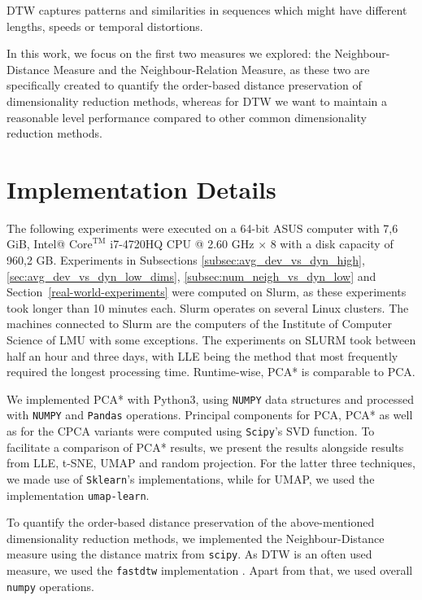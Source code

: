 \documentclass[pdftex,12pt,a4paper]{report}
\begin{document}
DTW captures patterns and similarities in sequences which might have different lengths, speeds or temporal distortions.

In this work, we focus on the first two measures we explored: the Neighbour-Distance Measure and the Neighbour-Relation Measure, as these two are specifically created to quantify the order-based distance preservation of dimensionality reduction methods, whereas for DTW we want to maintain a reasonable level performance compared to other common dimensionality reduction methods.

\section{Implementation Details}
The following experiments were executed on a 64-bit ASUS computer with 7,6 GiB, Intel@ $\mathrm{Core}^{\mathrm{TM}}$ i7-4720HQ CPU @ 2.60 GHz $\times$ 8 with a disk capacity of 960,2 GB.
Experiments in Subsections \ref{subsec:avg_dev_vs_dyn_high}, \ref{sec:avg_dev_vs_dyn_low_dims}, \ref{subsec:num_neigh_vs_dyn_low} and Section~\ref{real-world-experiments} were computed on Slurm, as these experiments took longer than 10 minutes each.
Slurm operates on several Linux clusters.
The machines connected to Slurm are the computers of the Institute of Computer Science of LMU with some exceptions.
The experiments on SLURM took between half an hour and three days, with LLE being the method that most frequently required the longest processing time.
Runtime-wise, PCA* is comparable to PCA.

We implemented PCA* with Python3, using \texttt{NUMPY} data structures and processed with \texttt{NUMPY} and \texttt{Pandas} operations.
Principal components for PCA, PCA* as well as for the CPCA variants were computed using \texttt{Scipy}'s SVD function.
To facilitate a comparison of PCA* results, we present the results alongside results from LLE, t-SNE, UMAP and random projection.
For the latter three techniques, we made use of \texttt{Sklearn}'s implementations, while for UMAP, we used the implementation \texttt{umap-learn}\cite{umap-implementation}.

To quantify the order-based distance preservation of the above-mentioned dimensionality reduction methods, we implemented the Neighbour-Distance measure using the distance matrix from \texttt{scipy}.
As DTW is an often used measure, we used the \texttt{fastdtw} implementation \cite{fastdtw-implementation}.
Apart from that, we used overall \texttt{numpy} operations.
\end{document}
